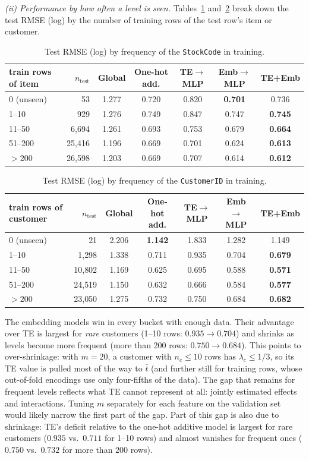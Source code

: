 \documentclass[11pt]{article}
\begin{document}
\emph{(ii) Performance by how often a level is seen.} Tables~\ref{tab:item} and~\ref{tab:cust}
break down the test RMSE (log) by the number of training rows of the test row's item or customer.
\begin{table}[H]\centering
\begin{tabular}{lrccccc}
\toprule
train rows of item & $n_{\text{test}}$ & Global & One-hot add. & TE$\to$MLP & Emb$\to$MLP & TE+Emb\\
\midrule
0 (unseen)  & 53     & 1.277 & 0.720 & 0.820 & \textbf{0.701} & 0.736\\
1--10       & 929    & 1.276 & 0.749 & 0.847 & 0.747 & \textbf{0.745}\\
11--50      & 6{,}694  & 1.261 & 0.693 & 0.753 & 0.679 & \textbf{0.664}\\
51--200     & 25{,}416 & 1.196 & 0.669 & 0.701 & 0.624 & \textbf{0.613}\\
$>200$      & 26{,}598 & 1.203 & 0.669 & 0.707 & 0.614 & \textbf{0.612}\\
\bottomrule
\end{tabular}
\caption{Test RMSE (log) by frequency of the \texttt{StockCode} in training.}
\label{tab:item}
\end{table}
\begin{table}[H]\centering
\begin{tabular}{lrccccc}
\toprule
train rows of customer & $n_{\text{test}}$ & Global & One-hot add. & TE$\to$MLP & Emb$\to$MLP & TE+Emb\\
\midrule
0 (unseen)  & 21     & 2.206 & \textbf{1.142} & 1.833 & 1.282 & 1.149\\
1--10       & 1{,}298  & 1.338 & 0.711 & 0.935 & 0.704 & \textbf{0.679}\\
11--50      & 10{,}802 & 1.169 & 0.625 & 0.695 & 0.588 & \textbf{0.571}\\
51--200     & 24{,}519 & 1.150 & 0.632 & 0.666 & 0.584 & \textbf{0.577}\\
$>200$      & 23{,}050 & 1.275 & 0.732 & 0.750 & 0.684 & \textbf{0.682}\\
\bottomrule
\end{tabular}
\caption{Test RMSE (log) by frequency of the \texttt{CustomerID} in training.}
\label{tab:cust}
\end{table}
The embedding models win in every bucket with enough data. Their advantage over
TE is largest for \emph{rare} customers (1--10 rows: $0.935 \to 0.704$) and
shrinks as levels become more frequent (more than 200 rows: $0.750 \to 0.684$).
This points to over-shrinkage: with $m = 20$, a customer with $n_c \le 10$ rows
has $\lambda_c \le 1/3$, so its TE value is pulled most of the way to $\bar t$
(and further still for training rows, whose out-of-fold encodings use only
four-fifths of the data). The gap that remains for frequent levels reflects what
TE cannot represent at all: jointly estimated effects and interactions. Tuning
$m$ separately for each feature on the validation set would likely narrow the
first part of the gap. Part of this gap is also due to shrinkage: TE's deficit relative to the one-hot
additive model is largest for rare customers ($0.935$ vs.\ $0.711$ for 1--10
rows) and almost vanishes for frequent ones ($0.750$ vs.\ $0.732$ for more than
200 rows).
\end{document}
